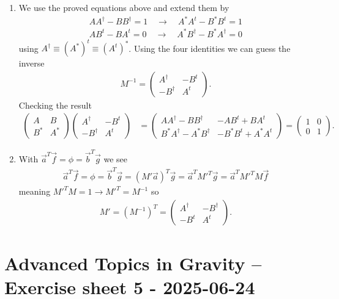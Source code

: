 \documentclass[10pt,a4paper]{article}
\theoremstyle{definition}
\begin{document}
\begin{enumerate}
\item We use the proved equations above and extend them by 
\begin{align}
AA^\dagger-BB^\dagger=1\quad\rightarrow\quad A^*A^t-B^*B^t=1\\
AB^t-BA^t=0\quad\rightarrow\quad A^*B^\dagger-B^*A^\dagger=0
\end{align}
using $A^\dagger\equiv(A^*)^t\equiv(A^t)^*$. Using the four identities we can guess the inverse
\begin{align}
M^{-1}=
\left(\begin{matrix}
A^\dagger & -B^t\\
-B^\dagger & A^t
\end{matrix}\right).
\end{align}
Checking the result
\begin{align}
\left(\begin{matrix}
A &B\\
B^*&A^*
\end{matrix}\right)
\left(\begin{matrix}
A^\dagger & -B^t\\
-B^\dagger & A^t
\end{matrix}\right)
&=
\left(\begin{matrix}
AA^\dagger-BB^\dagger & -AB^t+BA^t\\
B^*A^\dagger-A^*B^\dagger & -B^*B^t+A^*A^t
\end{matrix}\right)
=
\left(\begin{matrix}
1 & 0\\
0 & 1
\end{matrix}\right).
\end{align}

\item With $\vec{a}^T\vec{f}=\phi=\vec{b}^T\vec{g}$ we see
\begin{align}
\vec{a}^T\vec{f}
=\phi
=\vec{b}^T\vec{g}
=(M'\vec{a})^T\vec{g}
=\vec{a}^TM'^T\vec{g}
=\vec{a}^TM'^TM\vec{f}
\end{align}
meaning $M'^TM=1\rightarrow M'^T=M^{-1}$ so
\begin{align}
M'=(M^{-1})^T=
\left(\begin{matrix}
A^\dagger & -B^\dagger\\
-B^t & A^t
\end{matrix}\right).
\end{align}


\end{enumerate}

\newpage
\section*{Advanced Topics in Gravity – Exercise sheet 5 - 2025-06-24}
\end{document}
